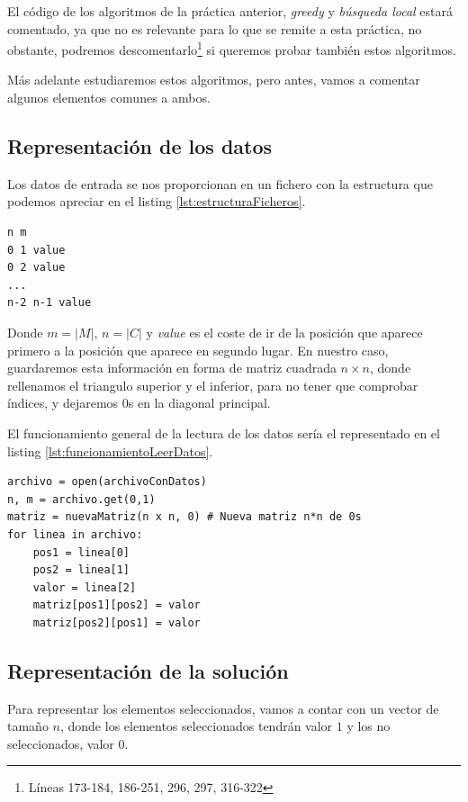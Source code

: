 El código de los algoritmos de la práctica anterior, \textit{greedy} y \textit{búsqueda local} estará comentado, ya que no es relevante para lo que se remite a esta práctica, no obstante, podremos descomentarlo\footnote{Líneas 173-184, 186-251, 296, 297, 316-322} si queremos probar también estos algoritmos.

Más adelante estudiaremos estos algoritmos, pero antes, vamos a comentar algunos elementos comunes a ambos.

\subsection{Representación de los datos}

Los datos de entrada se nos proporcionan en un fichero con la estructura que podemos apreciar en el listing \ref{lst:estructuraFicheros}.

\begin{lstlisting}[frame=single,caption={Estructura de los ficheros proporcionados},label=lst:estructuraFicheros, captionpos=b]
n m
0 1 value
0 2 value
...
n-2 n-1 value
\end{lstlisting}

Donde $m = |M|$, $n = |C|$ y \textit{value} es el coste de ir de la posición que aparece primero a la posición que aparece en segundo lugar. En nuestro caso, guardaremos esta información en forma de matriz cuadrada $n \times n$, donde rellenamos el triangulo superior y el inferior, para no tener que comprobar índices, y dejaremos 0s en la diagonal principal.

El funcionamiento general de la lectura de los datos sería el representado en el listing \ref{lst:funcionamientoLeerDatos}.

\begin{lstlisting}[frame=single, caption={Generalización de la lectura de los datos},label=lst:funcionamientoLeerDatos, captionpos=b]
archivo = open(archivoConDatos)
n, m = archivo.get(0,1)
matriz = nuevaMatriz(n x n, 0) # Nueva matriz n*n de 0s
for linea in archivo:
    pos1 = linea[0]
    pos2 = linea[1]
    valor = linea[2]
    matriz[pos1][pos2] = valor
    matriz[pos2][pos1] = valor
\end{lstlisting}


\subsection{Representación de la solución}

Para representar los elementos seleccionados, vamos a contar con un vector de tamaño $n$, donde los elementos seleccionados tendrán valor $1$ y los no seleccionados, valor $0$.

